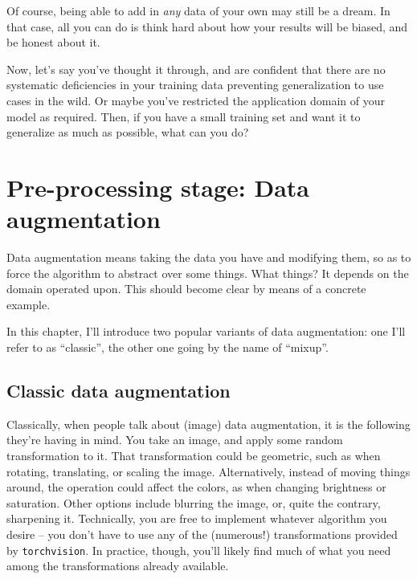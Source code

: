 \documentclass[
  letterpaper,
]{krantz}
\begin{document}
Of course, being able to add in \emph{any} data of your own may still be
a dream. In that case, all you can do is think hard about how your
results will be biased, and be honest about it.

Now, let's say you've thought it through, and are confident that there
are no systematic deficiencies in your training data preventing
generalization to use cases in the wild. Or maybe you've restricted the
application domain of your model as required. Then, if you have a small
training set and want it to generalize as much as possible, what can you
do?

\hypertarget{pre-processing-stage-data-augmentation}{%
\section{\texorpdfstring{Pre-processing stage: Data
augmentation}{Pre-processing stage: Data augmentation}}\label{pre-processing-stage-data-augmentation}}

Data augmentation means taking the data you have and modifying them, so
as to force the algorithm to abstract over some things. What things? It
depends on the domain operated upon. This should become clear by means
of a concrete example.

In this chapter, I'll introduce two popular variants of data
augmentation: one I'll refer to as ``classic'', the other one going by
the name of ``mixup''.

\hypertarget{classic-data-augmentation}{%
\subsection{Classic data augmentation}\label{classic-data-augmentation}}

Classically, when people talk about (image) data augmentation, it is the
following they're having in mind. You take an image, and apply some
random transformation to it. That transformation could be geometric,
such as when rotating, translating, or scaling the image. Alternatively,
instead of moving things around, the operation could affect the colors,
as when changing brightness or saturation. Other options include
blurring the image, or, quite the contrary, sharpening it. Technically,
you are free to implement whatever algorithm you desire -- you don't
have to use any of the (numerous!) transformations provided by
\texttt{torchvision}. In practice, though, you'll likely find much of
what you need among the transformations already available.
\end{document}
